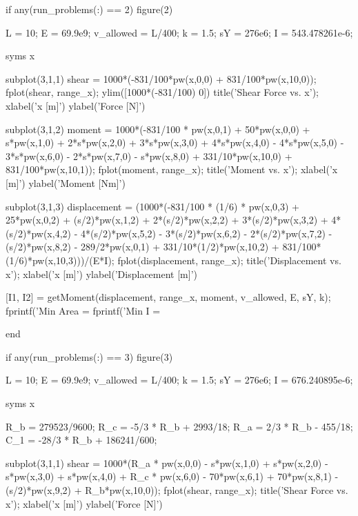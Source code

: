 \documentclass[a4paper]{article}
\begin{document}
\begin{verbatim*}
if any(run_problems(:) == 2)
    figure(2)

    L = 10; %
    E = 69.9e9; %
    v_allowed = L/400; %
    k = 1.5; %
    sY = 276e6; %
    I = 543.478261e-6; %

    syms x

    subplot(3,1,1)
    shear = 1000*(-831/100*pw(x,0,0) + 831/100*pw(x,10,0));
    fplot(shear, range_x);
    ylim([1000*(-831/100) 0])
    title('Shear Force vs. x');
    xlabel('x [m]')
    ylabel('Force [N]')

    subplot(3,1,2)
    moment = 1000*(-831/100 * pw(x,0,1) + 50*pw(x,0,0) + s*pw(x,1,0) + 2*s*pw(x,2,0) + 3*s*pw(x,3,0) + 4*s*pw(x,4,0) - 4*s*pw(x,5,0) - 3*s*pw(x,6,0) - 2*s*pw(x,7,0) - s*pw(x,8,0) + 331/10*pw(x,10,0) + 831/100*pw(x,10,1));
    fplot(moment, range_x);
    title('Moment vs. x');
    xlabel('x [m]')
    ylabel('Moment [Nm]')

    subplot(3,1,3)
    displacement = (1000*(-831/100 * (1/6) * pw(x,0,3) + 25*pw(x,0,2) + (s/2)*pw(x,1,2) + 2*(s/2)*pw(x,2,2) + 3*(s/2)*pw(x,3,2) + 4*(s/2)*pw(x,4,2) - 4*(s/2)*pw(x,5,2) - 3*(s/2)*pw(x,6,2) - 2*(s/2)*pw(x,7,2) - (s/2)*pw(x,8,2) - 289/2*pw(x,0,1) + 331/10*(1/2)*pw(x,10,2) + 831/100*(1/6)*pw(x,10,3)))/(E*I);
    fplot(displacement, range_x);
    title('Displacement vs. x');
    xlabel('x [m]')
    ylabel('Displacement [m]')

    [I1, I2] = getMoment(displacement, range_x, moment, v_allowed, E, sY, k);
    fprintf('Min Area = %
    fprintf('Min I = %
    
end

if any(run_problems(:) == 3)
    figure(3)

    L = 10; %
    E = 69.9e9; %
    v_allowed = L/400; %
    k = 1.5; %
    sY = 276e6; %
    I = 676.240895e-6; %

    syms x
    
    R_b = 279523/9600;
    R_c = -5/3 * R_b + 2993/18;
    R_a = 2/3 * R_b - 455/18;
    C_1 = -28/3 * R_b + 186241/600;
    
    subplot(3,1,1)
    shear = 1000*(R_a * pw(x,0,0) - s*pw(x,1,0) + s*pw(x,2,0) - s*pw(x,3,0) + s*pw(x,4,0) + R_c * pw(x,6,0) - 70*pw(x,6,1) + 70*pw(x,8,1) - (s/2)*pw(x,9,2) + R_b*pw(x,10,0));
    fplot(shear, range_x);
    title('Shear Force vs. x');
    xlabel('x [m]')
    ylabel('Force [N]')


\end{verbatim*}
\end{document}
